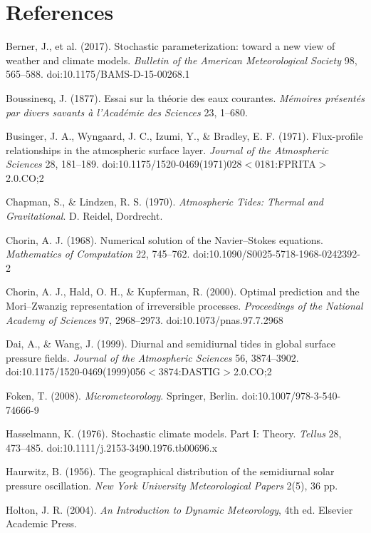 \documentclass[11pt]{article}
\begin{document}
\begingroup\sloppy
\section*{References}

Berner, J., et al. (2017). Stochastic parameterization: toward a new view of weather and climate models. \emph{Bulletin of the American Meteorological Society} 98, 565--588. doi:10.1175/BAMS-D-15-00268.1

Boussinesq, J. (1877). Essai sur la th\'eorie des eaux courantes. \emph{M\'emoires pr\'esent\'es par divers savants \`a l'Acad\'emie des Sciences} 23, 1--680.

Businger, J. A., Wyngaard, J. C., Izumi, Y., \& Bradley, E. F. (1971). Flux-profile relationships in the atmospheric surface layer. \emph{Journal of the Atmospheric Sciences} 28, 181--189. doi:10.1175/\hspace{0pt}1520-0469(1971)028$<$0181:FPRITA$>$2.0.CO;2

Chapman, S., \& Lindzen, R. S. (1970). \emph{Atmospheric Tides: Thermal and Gravitational}. D. Reidel, Dordrecht.

Chorin, A. J. (1968). Numerical solution of the Navier--Stokes equations. \emph{Mathematics of Computation} 22, 745--762. doi:10.1090/S0025-5718-1968-0242392-2

Chorin, A. J., Hald, O. H., \& Kupferman, R. (2000). Optimal prediction and the Mori--Zwanzig representation of irreversible processes. \emph{Proceedings of the National Academy of Sciences} 97, 2968--2973. doi:10.1073/pnas.97.7.2968

Dai, A., \& Wang, J. (1999). Diurnal and semidiurnal tides in global surface pressure fields. \emph{Journal of the Atmospheric Sciences} 56, 3874--3902. doi:10.1175/\hspace{0pt}1520-0469(1999)056$<$3874:DASTIG$>$2.0.CO;2

Foken, T. (2008). \emph{Micrometeorology}. Springer, Berlin. doi:10.1007/\hspace{0pt}978-3-540-74666-9

Hasselmann, K. (1976). Stochastic climate models. Part I: Theory. \emph{Tellus} 28, 473--485. doi:10.1111/\hspace{0pt}j.2153-3490.1976.tb00696.x

Haurwitz, B. (1956). The geographical distribution of the semidiurnal solar pressure oscillation. \emph{New York University Meteorological Papers} 2(5), 36 pp.

Holton, J. R. (2004). \emph{An Introduction to Dynamic Meteorology}, 4th ed. Elsevier Academic Press.
\end{document}

